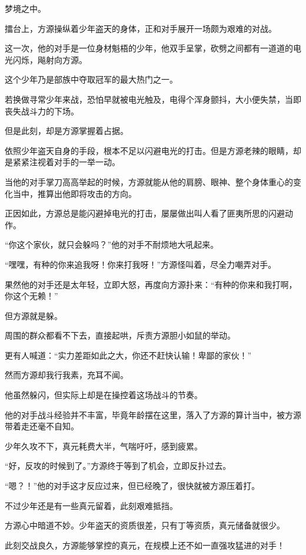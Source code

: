 
\begin{this_body}

梦境之中。

擂台上，方源操纵着少年盗天的身体，正和对手展开一场颇为艰难的对战。

这一次，他的对手是一位身材魁梧的少年，他双手呈掌，砍劈之间都有一道道的电光闪烁，飚射向方源。

这个少年乃是部族中夺取冠军的最大热门之一。

若换做寻常少年来战，恐怕早就被电光触及，电得个浑身颤抖，大小便失禁，当即丧失战斗力的下场。

但是此刻，却是方源掌握着占据。

依照少年盗天自身的手段，根本不足以闪避电光的打击。但是方源老辣的眼睛，却是紧紧注视着对手的一举一动。

当他的对手掌刀高高举起的时候，方源就能从他的肩膀、眼神、整个身体重心的变化当中，推算出他即将攻击的方向。

正因如此，方源总是能闪避掉电光的打击，屡屡做出叫人看了匪夷所思的闪避动作。

“你这个家伙，就只会躲吗？”他的对手不耐烦地大吼起来。

“嘿嘿，有种的你来追我呀！你来打我呀！”方源怪叫着，尽全力嘲弄对手。

果然他的对手还是太年轻，立即大怒，再度向方源扑来：“有种的你来和我打啊，你这个无赖！”

但方源就是躲。

周围的群众都看不下去，直接起哄，斥责方源胆小如鼠的举动。

更有人喊道：“实力差距如此之大，你还不赶快认输！卑鄙的家伙！”

然而方源却我行我素，充耳不闻。

他虽然躲闪，但实际上却是在操控着这场战斗的节奏。

他的对手战斗经验并不丰富，毕竟年龄摆在这里，落入了方源的算计当中，被方源带着走还毫不自知。

少年久攻不下，真元耗费大半，气喘吁吁，感到疲累。

“好，反攻的时候到了。”方源终于等到了机会，立即反扑过去。

“嗯？！”他的对手这才反应过来，但已经晚了，很快就被方源压着打。

不过少年还是有一些真元留着，此刻艰难抵挡。

方源心中暗道不妙。少年盗天的资质很差，只有丁等资质，真元储备就很少。

此刻交战良久，方源能够掌控的真元，在规模上还不如一直强攻猛进的对手！


\end{this_body}
